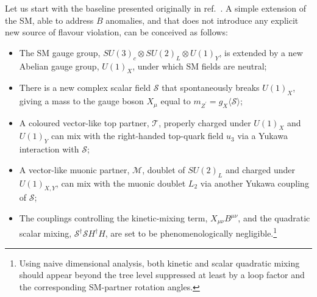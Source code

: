 Let us start with the baseline presented originally in ref.~\cite{Kamenik:2017tnu}. A simple extension of the SM, able to address $B$ anomalies, and  that does not introduce any explicit new source of flavour violation, can be conceived as follows:
\begin{itemize}
	\item The SM gauge group, $SU(3)_{c} \otimes SU(2)_{L} \otimes U(1)_{Y}$, is extended by a new Abelian gauge group, $U(1)_{X}$, under which SM fields are neutral;
	\item There is a new complex scalar field $\mathcal{S}$ that spontaneously breaks $U(1)_{X}$, giving a mass to the gauge boson $X_{\mu}$ equal to $m_{Z^{\prime}} = g_{X} \langle \mathcal{S} \rangle $;
	\item A coloured vector-like top partner, $\mathcal{T}$, properly charged under $U(1)_{X}$ and $U(1)_{Y}$ can mix with the right-handed top-quark field $u_{3}$ via a Yukawa interaction with $\mathcal{S}$; 
	\item A vector-like muonic partner, $\mathcal{M}$, doublet of $SU(2)_{L}$ and charged under $U(1)_{X,Y}$, can mix with the muonic doublet $L_2$ via another Yukawa coupling of $\mathcal{S}$;
	\item The couplings controlling the kinetic-mixing term, $X_{\mu \nu} B^{\mu \nu}$, and the quadratic scalar mixing, $\mathcal{S}^{\dagger}\mathcal{S} H^{\dagger} H$, are set to be phenomenologically negligible.\footnote{Using naive dimensional analysis, both kinetic and scalar quadratic mixing should appear beyond the tree level suppressed at least by a loop factor and the corresponding SM-partner rotation angles.} 
\end{itemize}

